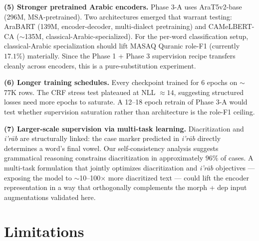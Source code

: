 \documentclass[10pt,a4paper,twocolumn]{article}
\newcommand{\irab}{\textit{i'r{\=a}b}}
\begin{document}
\textbf{(5) Stronger pretrained Arabic encoders.} Phase 3-A uses AraT5v2-base (296M, MSA-pretrained). Two architectures emerged that warrant testing: AraBART (139M, encoder-decoder, multi-dialect pretraining) and CAMeLBERT-CA ($\sim$135M, classical-Arabic-specialized). For the per-word classification setup, classical-Arabic specialization should lift MASAQ Quranic role-F1 (currently $17.1\%$) materially. Since the Phase 1 + Phase 3 supervision recipe transfers cleanly across encoders, this is a pure-substitution experiment.

\textbf{(6) Longer training schedules.} Every checkpoint trained for 6 epochs on $\sim$77K rows. The CRF stress test plateaued at NLL $\approx 14$, suggesting structured losses need more epochs to saturate. A 12--18 epoch retrain of Phase 3-A would test whether supervision saturation rather than architecture is the role-F1 ceiling.

\textbf{(7) Larger-scale supervision via multi-task learning.} Diacritization \cite{aldallal2025sadeed} and \irab{} are structurally linked: the case marker predicted in \irab{} directly determines a word's final vowel. Our self-consistency analysis suggests grammatical reasoning constrains diacritization in approximately $96\%$ of cases. A multi-task formulation that jointly optimizes diacritization and \irab{} objectives --- exposing the model to $\sim$10--100$\times$ more diacritized text --- could lift the encoder representation in a way that orthogonally complements the morph + dep input augmentations validated here.

\section{Limitations}
\label{sec:limitations}
\end{document}
